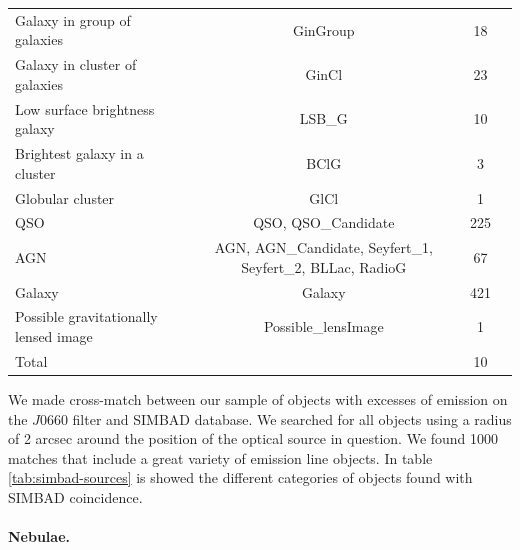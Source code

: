 \documentclass[fleqn,usenatbib]{mnras}
\begin{document}
\begin{table}
\begin{tabular}{lccc}
Galaxy in group of galaxies     & GinGroup           & 18                \\
Galaxy in cluster of galaxies   & GinCl              & 23                \\
Low surface brightness galaxy   & LSB\_G             & 10                \\
Brightest galaxy in a cluster   & BClG               & 3                 \\
Globular cluster            & GlCl                   & 1                 \\
QSO                         & QSO, QSO\_Candidate    & 225               \\
AGN                         & AGN, AGN\_Candidate, Seyfert\_1, Seyfert\_2, BLLac, RadioG  & 67  \\
Galaxy                      &  Galaxy                & 421               \\
Possible gravitationally lensed image & Possible\_lensImage & 1          \\
\hline
Total                       &                               & 10         \\
\hline
\end{tabular}
\end{table}

We made cross-match between our sample of objects with excesses of emission on
the $J$0660 filter and SIMBAD database. We searched for all objects using a radius of 2 arcsec
around the position of the optical source in question. We found 1000
matches that include a great variety of emission line objects. In table
\ref{tab:simbad-sources} is showed the different categories of objects found
with SIMBAD coincidence.

\paragraph{Nebulae.}
\end{document}
